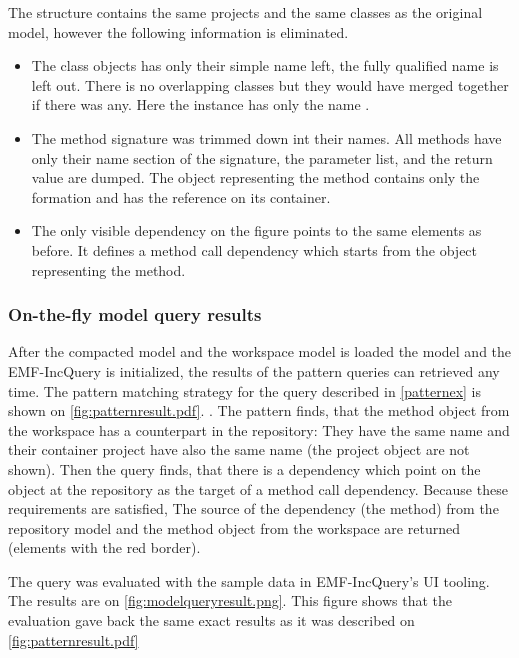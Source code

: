 The structure contains the same projects and the same
classes as the original model, however the following information is eliminated.
\begin{itemize}
  \item The class objects has only their simple name left, the fully qualified name is left out.
There is no overlapping classes but they would have merged together if
there was any. Here the  instance has only the name .
  \item The method signature was trimmed down int their names. All methods have only their 
name section of the signature, the parameter list, and the return value are dumped.    
The object representing the  method contains only the 
formation and has the reference on its container. 
  \item The only visible dependency on the figure points to the same elements as before.
  It defines a method call dependency which starts from the object representing the  method.
\end{itemize}



\subsubsection{On-the-fly model query results}
After the compacted  model and the workspace model is loaded the model and the
EMF-IncQuery is initialized, the results of the pattern queries can retrieved
any time.
The pattern matching strategy for the query described in \autoref{patternex} is
shown on \autoref{fig:patternresult.pdf}.
.
The pattern finds, that the  method object from the workspace has 
a counterpart in the repository: They have the same name and their container project
have also the same name (the project object are not shown). Then the query finds, 
that there is a dependency which point on the  object at the repository
as the target of a method call dependency. Because these requirements are satisfied, 
The source of the dependency (the  method) from the repository model and the
 method object from the workspace are returned (elements with the red border).
 
The query was evaluated with the sample data in EMF-IncQuery's UI tooling. The 
results are on \autoref{fig:modelqueryresult.png}.
This figure shows that the evaluation gave back the same exact results as it was described
on   \autoref{fig:patternresult.pdf}

